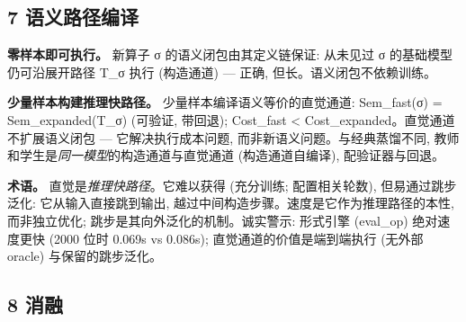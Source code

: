 \documentclass[
]{article}
\begin{document}
\subsection{7 语义路径编译}\label{ux8bedux4e49ux8defux5f84ux7f16ux8bd1}

\textbf{零样本即可执行。} 新算子 σ 的语义闭包由其定义链保证: 从未见过 σ
的基础模型仍可沿展开路径 T\_σ 执行 (构造通道) --- 正确,
但长。语义闭包不依赖训练。

\textbf{少量样本构建推理快路径。} 少量样本编译语义等价的直觉通道:
Sem\_fast(σ) = Sem\_expanded(T\_σ) (可验证, 带回退); Cost\_fast
\textless{} Cost\_expanded。直觉通道不扩展语义闭包 ---
它解决执行成本问题, 而非新语义问题。与经典蒸馏不同,
教师和学生是\emph{同一模型}的构造通道与直觉通道 (构造通道自编译),
配验证器与回退。

\textbf{术语。} 直觉是\emph{推理快路径}。它难以获得 (充分训练;
配置相关轮数), 但易通过跳步泛化: 它从输入直接跳到输出,
越过中间构造步骤。速度是它作为推理路径的本性, 而非独立优化;
跳步是其向外泛化的机制。诚实警示: 形式引擎 (eval\_op) 绝对速度更快 (2000
位时 0.069s vs 0.086s); 直觉通道的价值是端到端执行 (无外部 oracle)
与保留的跳步泛化。

\subsection{8 消融}\label{ux6d88ux878d}
\end{document}

